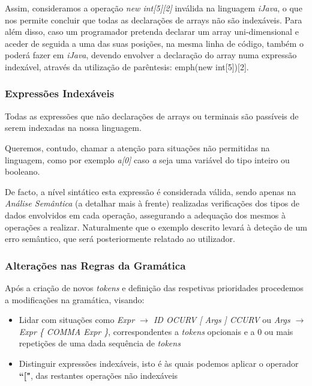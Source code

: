 \documentclass[11pt,a4paper]{article}
\begin{document}
Assim, consideramos a operação \emph{new int[5][2]} inválida na linguagem \emph{iJava}, o que nos permite concluir que todas as declarações de arrays não são indexáveis. Para além disso, caso um programador pretenda declarar um array uni-dimensional e aceder de seguida a uma das suas posições, na mesma linha de código, também o poderá fazer em \emph{iJava}, devendo envolver a declaração do array numa expressão indexável, através da utilização de parêntesis: emph{(new int[5])[2]}.

\subsubsection{Expressões Indexáveis}

Todas as expressões que não declarações de arrays ou terminais são passíveis de serem indexadas na nossa linguagem.

Queremos, contudo, chamar a atenção para situações não permitidas na linguagem, como por exemplo \emph{a[0]} caso \emph{a} seja uma variável do tipo inteiro ou booleano.

De facto, a nível sintático esta expressão é considerada válida, sendo apenas na \emph{Análise Semântica} (a detalhar mais à frente) realizadas verificações dos tipos de dados envolvidos em cada operação, assegurando a adequação dos mesmos à operações a realizar. Naturalmente que o exemplo descrito levará à deteção de um erro semântico, que será posteriormente relatado ao utilizador.

\subsubsection{Alterações nas Regras da Gramática}

Após a criação de novos \emph{tokens} e definição das respetivas prioridades procedemos a modificações na gramática, visando:

\begin{itemize}
\item Lidar com situações como \emph{Expr $\rightarrow$ ID OCURV [ Args ] CCURV} ou \emph{Args $\rightarrow$ Expr \{ COMMA Expr \}}, correspondentes a \emph{tokens} opcionais e a 0 ou mais repetições de uma dada sequência de \emph{tokens}

\item Distinguir expressões indexáveis, isto é às quais podemos aplicar o operador \textbf{``["}, das restantes operações não indexáveis
\end{itemize}
\end{document}
